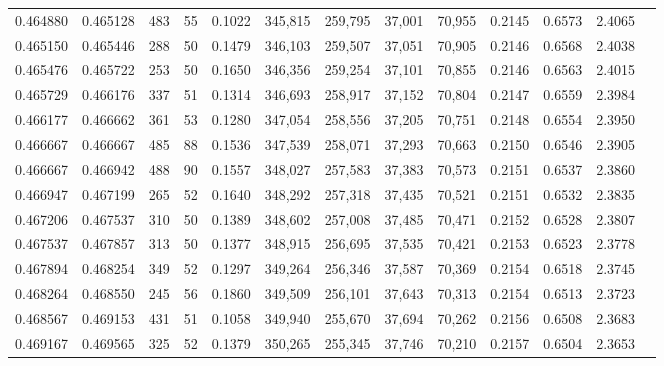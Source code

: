 \begin{tabular}{rrrrrrrrrrrrr}
0.464880 & 0.465128 &    483 &    55 &                                     0.1022 & 345,815 & 259,795 &  37,001 &  70,955 & 0.2145 & 0.6573 & 2.4065 \\
0.465150 & 0.465446 &    288 &    50 &                                     0.1479 & 346,103 & 259,507 &  37,051 &  70,905 & 0.2146 & 0.6568 & 2.4038 \\
0.465476 & 0.465722 &    253 &    50 &                                     0.1650 & 346,356 & 259,254 &  37,101 &  70,855 & 0.2146 & 0.6563 & 2.4015 \\
0.465729 & 0.466176 &    337 &    51 &                                     0.1314 & 346,693 & 258,917 &  37,152 &  70,804 & 0.2147 & 0.6559 & 2.3984 \\
0.466177 & 0.466662 &    361 &    53 &                                     0.1280 & 347,054 & 258,556 &  37,205 &  70,751 & 0.2148 & 0.6554 & 2.3950 \\
0.466667 & 0.466667 &    485 &    88 &                                     0.1536 & 347,539 & 258,071 &  37,293 &  70,663 & 0.2150 & 0.6546 & 2.3905 \\
0.466667 & 0.466942 &    488 &    90 &                                     0.1557 & 348,027 & 257,583 &  37,383 &  70,573 & 0.2151 & 0.6537 & 2.3860 \\
0.466947 & 0.467199 &    265 &    52 &                                     0.1640 & 348,292 & 257,318 &  37,435 &  70,521 & 0.2151 & 0.6532 & 2.3835 \\
0.467206 & 0.467537 &    310 &    50 &                                     0.1389 & 348,602 & 257,008 &  37,485 &  70,471 & 0.2152 & 0.6528 & 2.3807 \\
0.467537 & 0.467857 &    313 &    50 &                                     0.1377 & 348,915 & 256,695 &  37,535 &  70,421 & 0.2153 & 0.6523 & 2.3778 \\
0.467894 & 0.468254 &    349 &    52 &                                     0.1297 & 349,264 & 256,346 &  37,587 &  70,369 & 0.2154 & 0.6518 & 2.3745 \\
0.468264 & 0.468550 &    245 &    56 &                                     0.1860 & 349,509 & 256,101 &  37,643 &  70,313 & 0.2154 & 0.6513 & 2.3723 \\
0.468567 & 0.469153 &    431 &    51 &                                     0.1058 & 349,940 & 255,670 &  37,694 &  70,262 & 0.2156 & 0.6508 & 2.3683 \\
0.469167 & 0.469565 &    325 &    52 &                                     0.1379 & 350,265 & 255,345 &  37,746 &  70,210 & 0.2157 & 0.6504 & 2.3653 \\

\end{tabular}
